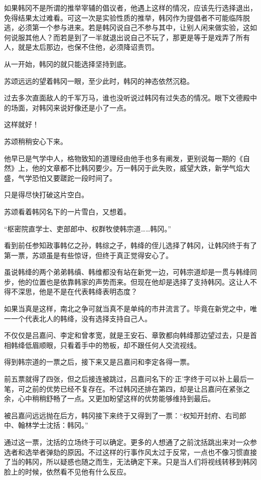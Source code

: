 如果韩冈不是所谓的推举宰辅的倡议者，他遇上这样的情况，应该先行选择退出，免得结果太过难看。可这一次是实验性质的推举，韩冈作为提倡者不可能临阵脱逃，必须第一个参与进来。若是韩冈说自己不参与其中，让别人闲来做实验，这如何说服其他人？而若是到了一半就退出说自己不玩了，那更是等于是戏弄了所有人，就是太后那边，也保不住他，必须降诏责罚。

从一开始，韩冈的就只能选择坚持到底。

苏颂远远的望着韩冈一眼，至少此时，韩冈的神态依然沉稳。

过去多次直面敌人的千军万马，谁也没听说过韩冈有过失态的情况。眼下文德殿中的场面，对韩冈来说好像还是小了一点。

这样就好！

苏颂稍稍安心下来。

他早已是气学中人，格物致知的道理经由他手也多有阐发，更别说每一期的《自然》上，他的文章都不比韩冈要少。万一韩冈于此失败，威望大跌，新学气焰大盛，气学恐怕又要蹉跎一段时间了。

只是得尽快打破这片空白。

苏颂看着韩冈名下的一片雪白，又想着。

“枢密院直学士、吏部郎中、权群牧使韩宗道……韩冈。”

看到前任参知政事韩亿之孙，韩综之子，韩绛的侄儿选择了韩冈，让韩冈终于有了第一票，苏颂虽是有些惊讶，但终于真正觉得安心了。

虽说韩绛的两个弟弟韩缜、韩维都没有站在新党一边，可韩宗道却是一贯与韩绛同步，他的位置也是依靠韩家的声势而来。但现在他却是选择了支持韩冈。这让人不得不深思，他是不是在代表韩绛表明态度？

如果当真是这样，南北之争可就当真不是单纯的市井流言了。毕竟在新党之中，唯一一个代表北人的韩绛，没有选择支持自己人。

不仅仅是吕嘉问、李定和曾孝宽，就是王安石、章敦都向韩绛那边望过去，只是首相韩绛低眉顺眼，只看着手中的笏板，却不跟任何人交流视线。

得到韩宗道的一票之后，接下来又是吕嘉问和李定各得一票。

前五票就得了四张，但之后接连被跳过，吕嘉问名下的‘正’字终于可以补上最后一笔，可之前的优势已经不复存在。不过韩冈还排在第四，却是让吕嘉问在紧张之余，心中稍稍舒畅了一点。又更加盼望这样的优势能够维持到最后。

被吕嘉问远远抛在后方，韩冈接下来终于又得到了一票：“权知开封府、右司郎中、翰林学士沈括：韩冈。”

通过这一票，沈括的立场终于可以确定。更多的人想通了之前沈括跳出来对一众参选者和选举者弹劾的原因。不过这样的行事作风太过于反常，一点也不像习惯直接了当的韩冈，所以疑惑也随之而生，无法确定下来。只是当人们将视线转移到韩冈脸上的时候，依然看不见他有什么反应。

